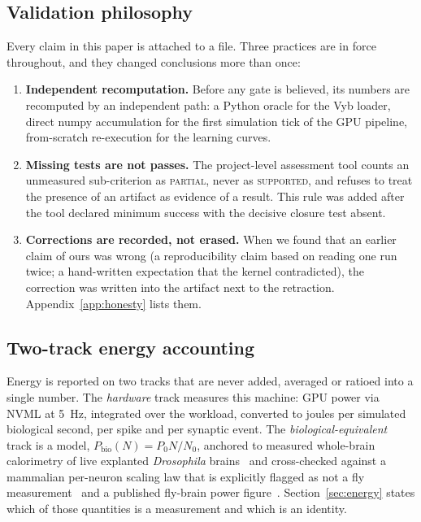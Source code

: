 \documentclass[11pt,a4paper]{article}
\begin{document}
\subsection{Validation philosophy}
Every claim in this paper is attached to a file. Three practices are in force throughout, and
they changed conclusions more than once:

\begin{enumerate}
\item \textbf{Independent recomputation.} Before any gate is believed, its numbers are recomputed
by an independent path: a Python oracle for the Vyb loader, direct numpy accumulation for the
first simulation tick of the GPU pipeline, from-scratch re-execution for the learning curves.
\item \textbf{Missing tests are not passes.} The project-level assessment tool counts an
unmeasured sub-criterion as \textsc{partial}, never as \textsc{supported}, and refuses to treat
the presence of an artifact as evidence of a result. This rule was added after the tool declared
minimum success with the decisive closure test absent.
\item \textbf{Corrections are recorded, not erased.} When we found that an earlier claim of ours
was wrong (a reproducibility claim based on reading one run twice; a hand-written expectation
that the kernel contradicted), the correction was written into the artifact next to the
retraction. Appendix~\ref{app:honesty} lists them.
\end{enumerate}

\subsection{Two-track energy accounting}
Energy is reported on two tracks that are never added, averaged or ratioed into a single number.
The \emph{hardware} track measures this machine: GPU power via NVML at 5~Hz, integrated over the
workload, converted to joules per simulated biological second, per spike and per synaptic event.
The \emph{biological-equivalent} track is a model, $P_{\text{bio}}(N) = P_0 N/N_0$, anchored to
measured whole-brain calorimetry of live explanted \textit{Drosophila}
brains~\cite{panda-calorimetry,panda-preprint} and cross-checked against a mammalian
per-neuron scaling law that is explicitly flagged as not a fly measurement~\cite{herculano-houzel}
and a published fly-brain power figure~\cite{scheffer-design}. Section~\ref{sec:energy} states
which of those quantities is a measurement and which is an identity.
\end{document}
